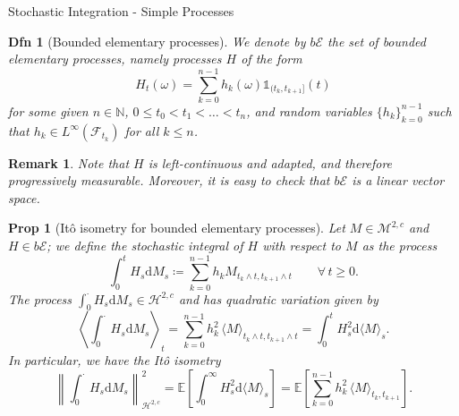 \documentclass[a4paper]{article}
\theoremstyle{mytheoremstyle}
\newtheorem{definition}{Dfn}
\newtheorem{proposition}{Prop}
\newtheorem*{remark}{Remark}
\newcommand{\1}{\mathds{1}}
\begin{document}
\begin{multicols*}{3}
\begin{roundbox}{Stochastic Integration - Simple Processes}
\begin{definition}[Bounded elementary processes]
  We denote by $b\mathcal{E}$ the set of {\emph{bounded elementary
  processes}}, namely processes $H$ of the form
  \begin{equation}
    H_t (\omega) = \sum_{k = 0}^{n - 1} h_k (\omega) \1_{(t_k, t_{k +
    1}]} (t) \label{eq:defn.elementary.process}
  \end{equation}
  for some given $n \in \mathbb{N}$, $0 \leqslant t_0 < t_1 < \ldots < t_n$,
  and random variables $\{ h_k \}_{k = 0}^{n - 1}$ such that $h_k \in
  L^{\infty} (\mathcal{F}_{t_k})$ for all $k \le n$.
\end{definition}

\begin{remark}
  Note that $H$ is left-continuous and adapted, and therefore progressively
  measurable. Moreover, it is easy to check that $b\mathcal{E}$ is a linear
  vector space.
\end{remark}

\begin{proposition}[It{\^o} isometry for bounded elementary processes]
  \label{prop:ito.isometry.elementary}Let $M \in \mathcal{M}^{2, c}$ and $H
  \in b\mathcal{E}$; we define the {\emph{stochastic integral}} of $H$ with
  respect to $M$ as the process
  \[ \int_0^t H_s \mathrm{d} M_s \coloneq \sum_{k = 0}^{n - 1} h_k M_{t_k \wedge t,
     t_{k + 1} \wedge t} \qquad \forall \, t \geqslant 0.
     \label{eq:defn.stoch.integral.elementary} \]
  The process $\int_0^{\cdot} H_s \mathrm{d} M_s \in \mathcal{H}^{2, c}$ and has
  quadratic variation given by
  \begin{equation}
    \left\langle \int_0^{\cdot} H_s \mathrm{d} M_s \right\rangle_t = \sum_{k =
    0}^{n - 1} h_k^2 \, \langle M \rangle_{t_k \wedge t, t_{k + 1} \wedge t} =
    \int_0^t H_s^2 \mathrm{d} \langle M \rangle_s .
    \label{eq:ito.isometry.quadratic.elementary}
  \end{equation}
  In particular, we have the {\emph{It\^{o} isometry}}
  \begin{equation}
    \left\| \int_0^{\cdot} H_s \mathrm{d} M_s \right\|_{\mathcal{H}^{2, c}}^2
    =\mathbb{E} \left[ \int_0^{\infty} H_s^2 \mathrm{d} \langle M \rangle_s
    \right] =\mathbb{E} \left[ \sum_{k = 0}^{n - 1} h_k^2 \, \langle M
    \rangle_{t_k, t_{k + 1}} \right] . \label{eq:ito.isometry.elementary}
  \end{equation}
\end{proposition}
\end{roundbox}


\end{multicols*}
\end{document}
